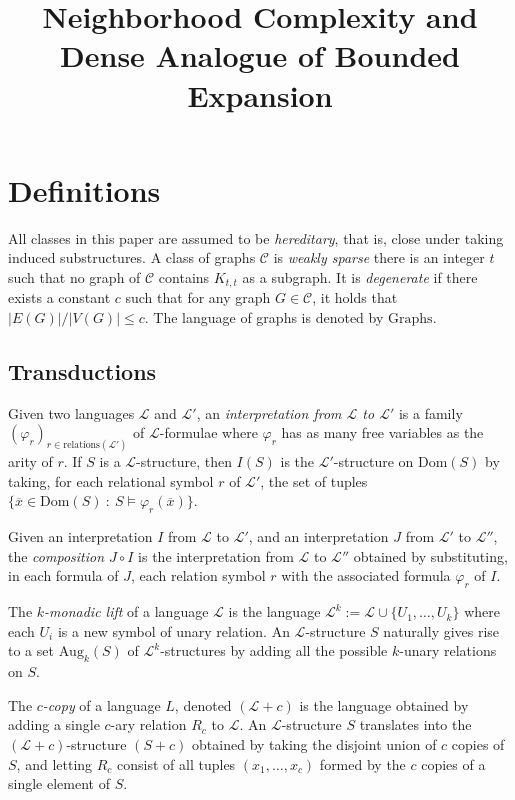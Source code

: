 \documentclass[11pt]{article}
\theoremstyle{definition}
\newcommand{\CC}{{\mathscr C}}
\renewcommand{\le}{\leqslant}
\newcommand{\Ll}{\mathcal L}
\newcommand{\Dom}{\text{Dom}}
\newcommand{\remph}[1]{{\color{red} \emph{#1}}}
\newcommand{\Aug}{\text{Aug}}
\newcommand{\Graphs}{\mathrm{Graphs}}
\begin{document}
\title{Neighborhood Complexity and Dense Analogue of Bounded Expansion}
\date{}
\maketitle

\section{Definitions}
All classes in this paper are assumed to be \remph{hereditary}, that is, close under taking induced substructures.
A class of graphs $\CC$ is \remph{weakly sparse} there is an integer $t$ such that no graph of $\CC$ contains $K_{t, t}$ as a subgraph. It is \remph{degenerate} if there exists a constant $c$ such that for any graph $G \in \CC$, it holds that $|E(G)|/|V(G)| \le c$.
The language of graphs is denoted by \remph{$\Graphs$}.

\subsection{Transductions}
Given two languages $\Ll$ and $\Ll'$,
an \remph{interpretation from $\Ll$ to $\Ll'$} is
a family $(\varphi_r)_{r \in \text{relations}(\Ll')}$ of $\Ll$-formulae where $\varphi_r$ has as many free variables as the arity of $r$.
If $S$ is a $\Ll$-structure, then \remph{$I(S)$} is the $\Ll'$-structure on $\Dom(S)$ by taking, for each relational symbol $r$ of $\Ll'$, the set of tuples
$\{\overline x \in \Dom(S)~:~S \models \varphi_r(\overline x)\}$. 

Given an interpretation $I$ from $\Ll$ to $\Ll'$,
and an interpretation $J$ from $\Ll'$ to $\Ll''$, the \remph{composition $J \circ I$} is the interpretation from $\Ll$ to $\Ll''$ obtained by substituting, in each formula of $J$, each relation symbol $r$ with the associated formula $\varphi_r$ of $I$.

The \remph{$k$-monadic lift} of a language $\Ll$ is the language
$\Ll^k := \Ll \cup \{U_1, \dots, U_k\}$ where each $U_i$ is a new symbol of unary relation.
An $\Ll$-structure $S$ naturally gives rise to a set \remph{$\Aug_k(S)$} of $\Ll^k$-structures by adding all the possible $k$-unary relations on $S$.

The \remph{$c$-copy} of a language $L$, denoted $(\Ll + c)$ is the language obtained by adding a single $c$-ary relation $R_c$ to $\Ll$.
An $\Ll$-structure $S$ translates into the $(\Ll + c)$-structure $(S + c)$ obtained by taking the disjoint union of $c$ copies of $S$, and letting $R_c$ consist of all tuples $(x_1, \ldots, x_c)$ formed by the $c$ copies of a single element of $S$.
\end{document}
